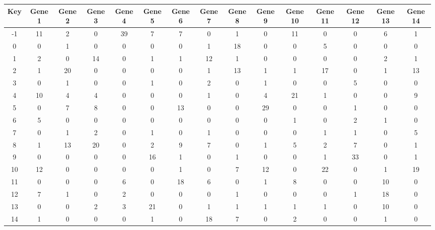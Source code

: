 \begin{tabular}{|c|c|c|c|c|c|c|c|c|c|c|c|c|c|c|}
\hline
Key & Gene 1 & Gene 2 & Gene 3 & Gene 4 & Gene 5 & Gene 6 & Gene 7 & Gene 8 & Gene 9 & Gene 10 & Gene 11 & Gene 12 & Gene 13 & Gene 14 \\
\hline
-1 & 11 & 2 & 0 & 39 & 7 & 7 & 0 & 1 & 0 & 11 & 0 & 0 & 6 & 1 \\
0 & 0 & 1 & 0 & 0 & 0 & 0 & 1 & 18 & 0 & 0 & 5 & 0 & 0 & 0 \\
1 & 2 & 0 & 14 & 0 & 1 & 1 & 12 & 1 & 0 & 0 & 0 & 0 & 2 & 1 \\
2 & 1 & 20 & 0 & 0 & 0 & 0 & 1 & 13 & 1 & 1 & 17 & 0 & 1 & 13 \\
3 & 0 & 1 & 0 & 0 & 1 & 0 & 2 & 0 & 1 & 0 & 0 & 5 & 0 & 0 \\
4 & 10 & 4 & 4 & 0 & 0 & 0 & 1 & 0 & 4 & 21 & 1 & 0 & 0 & 9 \\
5 & 0 & 7 & 8 & 0 & 0 & 13 & 0 & 0 & 29 & 0 & 0 & 1 & 0 & 0 \\
6 & 5 & 0 & 0 & 0 & 0 & 0 & 0 & 0 & 0 & 1 & 0 & 2 & 1 & 0 \\
7 & 0 & 1 & 2 & 0 & 1 & 0 & 1 & 0 & 0 & 0 & 1 & 1 & 0 & 5 \\
8 & 1 & 13 & 20 & 0 & 2 & 9 & 7 & 0 & 1 & 5 & 2 & 7 & 0 & 1 \\
9 & 0 & 0 & 0 & 0 & 16 & 1 & 0 & 1 & 0 & 0 & 1 & 33 & 0 & 1 \\
10 & 12 & 0 & 0 & 0 & 0 & 1 & 0 & 7 & 12 & 0 & 22 & 0 & 1 & 19 \\
11 & 0 & 0 & 0 & 6 & 0 & 18 & 6 & 0 & 1 & 8 & 0 & 0 & 10 & 0 \\
12 & 7 & 1 & 0 & 2 & 0 & 0 & 0 & 1 & 0 & 0 & 0 & 1 & 18 & 0 \\
13 & 0 & 0 & 2 & 3 & 21 & 0 & 1 & 1 & 1 & 1 & 1 & 0 & 10 & 0 \\
14 & 1 & 0 & 0 & 0 & 1 & 0 & 18 & 7 & 0 & 2 & 0 & 0 & 1 & 0 \\
\hline
\end{tabular}